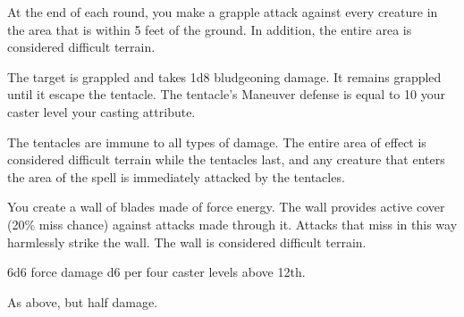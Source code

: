 \spelldur{\durshort \dismissable}
\begin{spelleffect}
    At the end of each round, you make a grapple attack against every creature in the area that is within 5 feet of the ground. In addition, the entire area is considered difficult terrain.
\end{spelleffect}
\begin{spellsuccess}
    The target is grappled and takes 1d8 bludgeoning damage. It remains grappled until it escape the tentacle. The tentacle's Maneuver defense is equal to 10 \add your caster level \add your casting attribute.
\end{spellsuccess}
\begin{spellnotes}
    \par The tentacles are immune to all types of damage. The entire area of effect is considered difficult terrain while the tentacles last, and any creature that enters the area of the spell is immediately attacked by the tentacles.
\end{spellnotes}

\spelldur{\durshort \dismissable}
\begin{spelleffect}
    You create a wall of blades made of force energy. The wall provides active cover (20\% miss chance) against attacks made through it. Attacks that miss in this way harmlessly strike the wall. The wall is considered difficult terrain.
\end{spelleffect}
\begin{spellsuccess}
    6d6 force damage \add d6 per four caster levels above 12th.
\end{spellsuccess}
\begin{spellfailure}
    As above, but half damage.
\end{spellfailure}

